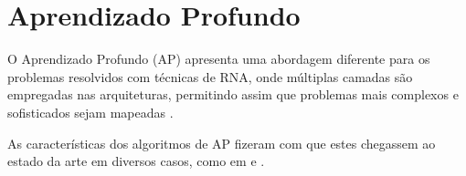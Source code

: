 




\section{Aprendizado Profundo}

O Aprendizado Profundo (AP) apresenta uma abordagem diferente para os problemas resolvidos com técnicas de RNA, onde múltiplas camadas são empregadas nas arquiteturas, permitindo assim que problemas mais complexos e sofisticados sejam mapeadas \cite{Goodfellow-et-al-2016}.

As características dos algoritmos de AP fizeram com que estes chegassem ao estado da arte em diversos casos, como em \cite{Shankar2017} e \cite{Krizhevsky2012}. 




